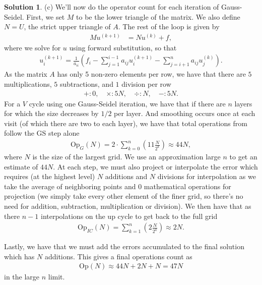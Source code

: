 \documentclass[12pt]{article}
\theoremstyle{definition}
\newtheorem{sol}{Solution}
\theoremstyle{remark}
\begin{document}
\begin{sol}
(c) We'll now do the operator count for each iteration of Gauss-Seidel. First, we set $M$ to be the lower triangle of the matrix. We also define $N = U$, the strict upper triangle of $A$.  The rest of the loop is given by
\begin{align*}
    M u^{(k+1)} &= N u^{(k)} + f,
\end{align*}
where we solve for $u$ using forward substitution, so that
\begin{align*}
    u^{(k+1)}_{i} = \frac{1}{a_{ii}} \left(f_{i} - \sum_{j=1}^{i-1} a_{ij}  u^{(k+1)}_{i}  - \sum_{j=i+1}^{n} a_{ij} u_{j}^{(k)}\right).
\end{align*}
As the matrix $A$ has only 5 non-zero elements per row, we have that there are $5$ multiplications, $5$ subtractions, and $1$ division per row
\begin{align*}
    +: 0, \quad  \times: 5N, \quad \div: N, \quad -: 5N.
\end{align*}
For a $V$ cycle using one Gauss-Seidel iteration, we have that if there are $n$ layers for which the size decreases by $1 / 2$ per layer. And smoothing occurs once at each visit (of which there are two to each layer), we have that total operations from follow the GS step alone
\begin{align*}
    \text{Op}_{G}(N) =  2 \cdot \sum_{k = 0}^{n} \left(11\frac{N}{2^{k}}\right) \approx 44N,
\end{align*}
where $N$ is the size of the largest grid. We use an approximation large $n$ to get an estimate of $44N$. At each step, we must also project or interpolate the error which requires (at the highest level) $N$ additions and $N$ divisions for interpolation as we take the average of neighboring points and 0 mathematical operations for projection (we simply take every other element of the finer grid, so there's no need for addition, subtraction, multiplication or division). We then have that as there $n-1$ interpolations on the up cycle to get back to the full grid
 \begin{align*}
     \text{Op}_{IC}(N) = \sum_{k=1}^{n} \left(  2 \frac{N}{2^{k}}    \right) \approx 2N.
\end{align*}

Lastly, we have that we must add the errors accumulated to the final solution which has $N$ additions. This gives a final operations count as
 \begin{align*}
     \text{Op}(N) \approx 44N + 2N + N = 47N
\end{align*}
in the large $n$ limit.
\end{sol}
\end{document}
